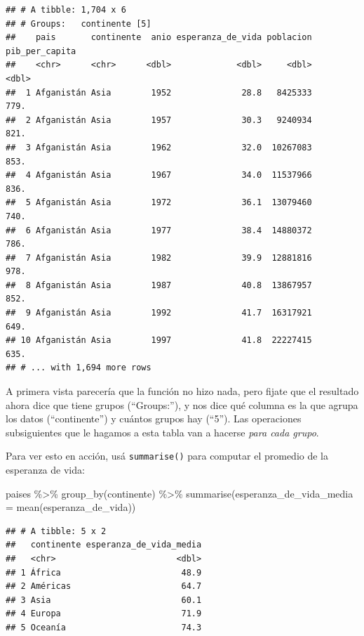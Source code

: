 \documentclass[
  openany]{book}
\newenvironment{Shaded}{\begin{snugshade}}{\end{snugshade}}
\newcommand{\AttributeTok}[1]{\textcolor[rgb]{0.77,0.63,0.00}{#1}}
\newcommand{\FunctionTok}[1]{\textcolor[rgb]{0.00,0.00,0.00}{#1}}
\newcommand{\NormalTok}[1]{#1}
\newcommand{\SpecialCharTok}[1]{\textcolor[rgb]{0.00,0.00,0.00}{#1}}
\begin{document}
\begin{verbatim}
## # A tibble: 1,704 x 6
## # Groups:   continente [5]
##    pais       continente  anio esperanza_de_vida poblacion pib_per_capita
##    <chr>      <chr>      <dbl>             <dbl>     <dbl>          <dbl>
##  1 Afganistán Asia        1952              28.8   8425333           779.
##  2 Afganistán Asia        1957              30.3   9240934           821.
##  3 Afganistán Asia        1962              32.0  10267083           853.
##  4 Afganistán Asia        1967              34.0  11537966           836.
##  5 Afganistán Asia        1972              36.1  13079460           740.
##  6 Afganistán Asia        1977              38.4  14880372           786.
##  7 Afganistán Asia        1982              39.9  12881816           978.
##  8 Afganistán Asia        1987              40.8  13867957           852.
##  9 Afganistán Asia        1992              41.7  16317921           649.
## 10 Afganistán Asia        1997              41.8  22227415           635.
## # ... with 1,694 more rows
\end{verbatim}

A primera vista parecería que la función no hizo nada, pero fijate que el resultado ahora dice que tiene grupos (``Groups:''), y nos dice qué columna es la que agrupa los datos (``continente'') y cuántos grupos hay (``5'').
Las operaciones subsiguientes que le hagamos a esta tabla van a hacerse \emph{para cada grupo}.

Para ver esto en acción, usá \texttt{summarise()} para computar el promedio de la esperanza de vida:

\begin{Shaded}
\begin{Highlighting}[]
\NormalTok{paises }\SpecialCharTok{\%\textgreater{}\%} 
  \FunctionTok{group\_by}\NormalTok{(continente) }\SpecialCharTok{\%\textgreater{}\%} 
  \FunctionTok{summarise}\NormalTok{(}\AttributeTok{esperanza\_de\_vida\_media =} \FunctionTok{mean}\NormalTok{(esperanza\_de\_vida))}
\end{Highlighting}
\end{Shaded}

\begin{verbatim}
## # A tibble: 5 x 2
##   continente esperanza_de_vida_media
##   <chr>                        <dbl>
## 1 África                        48.9
## 2 Américas                      64.7
## 3 Asia                          60.1
## 4 Europa                        71.9
## 5 Oceanía                       74.3
\end{verbatim}
\end{document}
